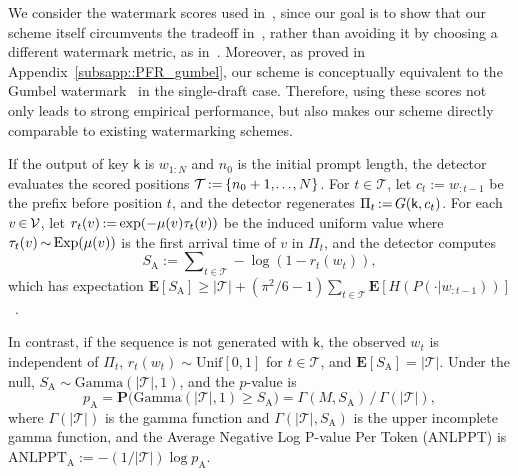 \documentclass{article}
\theoremstyle{plain}
\theoremstyle{definition}
\begin{document}
{\color{teal}
We consider the watermark scores used in~\citep{aaronson2023watermarking, hu2024inevitable}, since our goal is to show that our scheme itself circumvents the tradeoff in~\citep{hu2024inevitable}, rather than avoiding it by choosing a different watermark metric, as in~\citep{he2026improving}. 
Moreover, as proved in Appendix~\ref{subsapp::PFR_gumbel}, our scheme is conceptually equivalent to the Gumbel watermark~\citep{aaronson2023watermarking} in the single-draft case. 
Therefore, using these scores not only leads to strong empirical performance, but also makes our scheme directly comparable to existing watermarking schemes.
}


If the output of key $\mathsf{k}$ is $w_{1:N}$ and $n_0$ is the initial prompt length, the detector evaluates the scored positions $\mathcal{T} \hspace{-1pt} := \hspace{-1pt}  \{n_0+1,\hspace{-1pt} \ldots\hspace{-1pt} ,N\}$. 
For $t\in\mathcal{T}$, let $c_t := w_{:t-1}$ be the prefix before position $t$, and the detector regenerates $\Pi_t\hspace{-1pt}  := \hspace{-1pt} G(\mathsf{k}, c_t)$. 
For each $v\hspace{-1pt} \in\hspace{-1pt} \mathcal{V}$, let $r_t(v)\hspace{-1pt} :=\hspace{-1pt}  \exp(-\mu(v)\tau_t(v))$ be the induced  uniform value where $\tau_t(v)\hspace{-1pt} \sim \hspace{-1pt} \mathrm{Exp}(\mu(v))$ is the first arrival time of $v$ in $\Pi_t$, and the detector computes
\vspace{-5pt}
\begin{equation}
    S_{\mathrm{A}}
    :=
    \sum\nolimits_{t\in\mathcal{T}} -\log(1-r_t(w_t)),\label{eq::S_A}
\end{equation}
which has expectation $\mathbf{E}[S_{\mathrm{A}}] \geq |\mathcal{T}| + (\pi^2/6-1)\sum_{t\in \mathcal{T}} \mathbf{E}[H(P(\cdot|w_{:t-1}))]$~\citep{aaronson2023watermarking}. 

In contrast, %
if the sequence is not generated with $\mathsf{k}$, the observed $w_t$ is independent of $\Pi_t$, %
$r_t(w_t)\sim \mathrm{Unif}[0,1]$ for $t\in\mathcal{T}$, and $\mathbf{E}[S_{\mathrm{A}}]  = |\mathcal{T}|$. 
Under the null, $S_{\mathrm{A}} \sim \mathrm{Gamma}(|\mathcal{T}|,1)$, and the $p$-value is \vspace{-2pt}
\[
p_{\mathrm{A}}
=
\mathbf{P}\big(\mathrm{Gamma}(|\mathcal{T}|, 1)\ge S_{\mathrm{A}}\big)
= \Gamma(M,S_{\mathrm{A}}) \,/\, \Gamma(|\mathcal{T}|), 
\]
where $\Gamma(|\mathcal{T}|)$ is the gamma function and $\Gamma(|\mathcal{T}|, S_{\mathrm{A}})$ is the upper incomplete gamma function, and the Average Negative Log P-value Per Token (ANLPPT) is $\mathrm{ANLPPT}_{\mathrm{A}} := -(1/|\mathcal{T}|) \log p_{\mathrm{A}}$. 
\vspace{-5pt}
\end{document}
